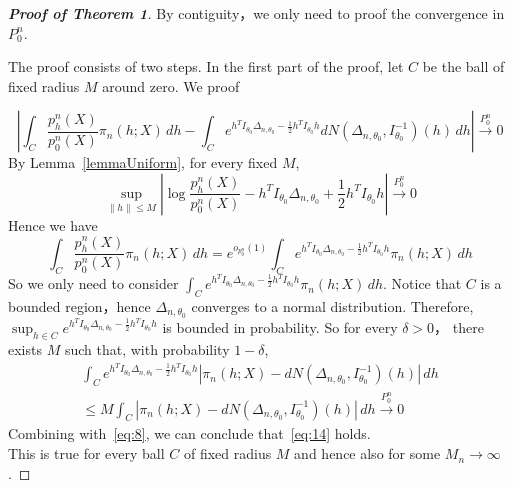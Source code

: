 




\begin{proof}[\textbf{Proof of Theorem 1}]
    By contiguity，we only need to proof the convergence in $P_0^n$.

The proof consists of two steps. In the first part of the proof, let $C$ be the ball of fixed radius $M$ around zero. We proof

\begin{equation}\label{eq:14}
    \left|\int_C \frac{p^n_h(X)}{p^n_0(X)}\pi_n (h;X) \, dh-\int_C e^{h^T I_{\theta_0}\Delta_{n,\theta_0}-\frac{1}{2}h^T I_{\theta_0}h}dN(\Delta_{n,\theta_0},I_{\theta_0}^{-1})(h)\, dh\right|
 \xrightarrow{P^n_0}0
\end{equation}
By Lemma~\ref{lemmaUniform}, for every fixed $M$,
\begin{equation}
    \sup_{\|h\|\leq M}|\log \frac{p_h^n(X)}{p_0^n(X)}-h^T I_{\theta_0}\Delta_{n,\theta_0}+\frac{1}{2}h^T I_{\theta_0}h|\xrightarrow{P_0^n}0 
\end{equation}
Hence we have
\begin{equation}\label{eq:8}
    \int_C \frac{p_h^n(X)}{p_0^n(X)}\pi_n (h;X) \, dh=e^{o_{p^n_0}(1)}\int_C e^{h^T I_{\theta_0}\Delta_{n,\theta_0}-\frac{1}{2}h^T I_{\theta_0}h}\pi_n (h;X) \, dh
\end{equation}
So we only need to consider $\int_C e^{h^T I_{\theta_0}\Delta_{n,\theta_0}-\frac{1}{2}h^T I_{\theta_0}h}\pi_n (h;X) \, dh$.
    Notice that $C$ is a bounded region，hence $\Delta_{n,\theta_0}$ converges to a normal distribution. Therefore, $\sup_{h\in C}e^{h^T I_{\theta_0}\Delta_{n,\theta_0}-\frac{1}{2}h^T I_{\theta_0}h}$ is bounded in probability. So for every $\delta>0$， there exists $M$ such that, with probability $1-\delta$,
\begin{equation}
\begin{aligned}
    \int_C e^{h^T I_{\theta_0}\Delta_{n,\theta_0}-\frac{1}{2}h^T I_{\theta_0}h}|\pi_n (h;X)-dN(\Delta_{n,\theta_0},I_{\theta_0}^{-1})(h)|\, dh
\\
\leq M\int_C |\pi_n(h;X)-dN(\Delta_{n,\theta_0},I_{\theta_0}^{-1})(h)|\, dh\xrightarrow{P^n_0}0
\end{aligned}
\end{equation}
Combining with~\eqref{eq:8}, we can conclude that~\eqref{eq:14} holds. \\

This is true for every ball $C$ of fixed radius $M$ and hence also for some $M_n\to \infty$.


\end{proof}
